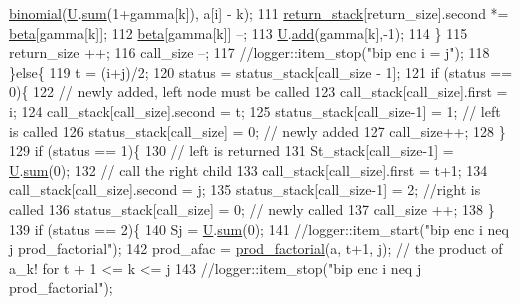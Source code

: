 \begin{DoxyCode}
      \hyperlink{compression__helper_8cpp_acecca9cb279d3b3d82915a07d67818cf}{binomial}(\hyperlink{classb__graph__encoder_ac810138443002a2b2cf579ced2dc34ce}{U}.\hyperlink{classreverse__fenwick__tree_a672731fd6395b4853430073a099a80e6}{sum}(1+gamma[k]), a[i] - k);
111         \hyperlink{namespacehelper__vars_a6d2100c373830cacd232319a9958652d}{return\_stack}[return\_size].second *= \hyperlink{classb__graph__encoder_ae54d76cc4cee399d98951f870897a144}{beta}[gamma[k]];
112         \hyperlink{classb__graph__encoder_ae54d76cc4cee399d98951f870897a144}{beta}[gamma[k]] --;
113         \hyperlink{classb__graph__encoder_ac810138443002a2b2cf579ced2dc34ce}{U}.\hyperlink{classreverse__fenwick__tree_a942d7f49b37e53ebfec3076d177691d7}{add}(gamma[k],-1);
114       \}
115       return\_size ++;
116       call\_size --;
117       \textcolor{comment}{//logger::item\_stop("bip enc i = j");}
118     \}\textcolor{keywordflow}{else}\{
119       t = (i+j)/2;
120       status = status\_stack[call\_size - 1];
121       \textcolor{keywordflow}{if} (status == 0)\{
122         \textcolor{comment}{// newly added, left node must be called}
123         call\_stack[call\_size].first = i;
124         call\_stack[call\_size].second = t;
125         status\_stack[call\_size-1] = 1; \textcolor{comment}{// left is called}
126         status\_stack[call\_size] = 0; \textcolor{comment}{// newly added}
127         call\_size++;
128       \}
129       \textcolor{keywordflow}{if} (status == 1)\{
130         \textcolor{comment}{// left is returned}
131         St\_stack[call\_size-1] = \hyperlink{classb__graph__encoder_ac810138443002a2b2cf579ced2dc34ce}{U}.\hyperlink{classreverse__fenwick__tree_a672731fd6395b4853430073a099a80e6}{sum}(0);
132         \textcolor{comment}{// call the right child}
133         call\_stack[call\_size].first = t+1;
134         call\_stack[call\_size].second = j;
135         status\_stack[call\_size-1] = 2; \textcolor{comment}{//right is called}
136         status\_stack[call\_size] = 0;  \textcolor{comment}{// newly called}
137         call\_size ++;
138       \}
139       \textcolor{keywordflow}{if} (status == 2)\{
140         Sj = \hyperlink{classb__graph__encoder_ac810138443002a2b2cf579ced2dc34ce}{U}.\hyperlink{classreverse__fenwick__tree_a672731fd6395b4853430073a099a80e6}{sum}(0);
141         \textcolor{comment}{//logger::item\_start("bip enc i neq j prod\_factorial");}
142         prod\_afac = \hyperlink{compression__helper_8cpp_a86d8a20e022dc06b23df3b08ac10b7d1}{prod\_factorial}(a, t+1, j); \textcolor{comment}{// the product of a\_k! for t + 1 <= k <= j}
143         \textcolor{comment}{//logger::item\_stop("bip enc i neq j prod\_factorial");}

\end{DoxyCode}
